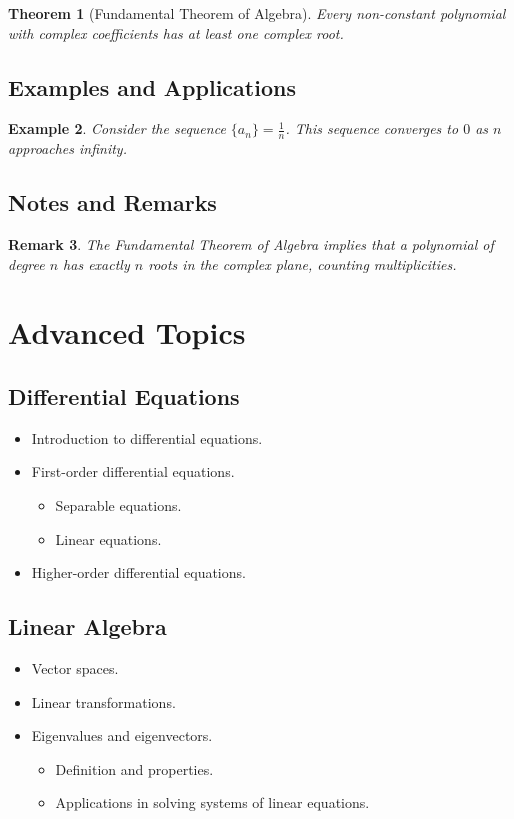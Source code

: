 \documentclass[11pt]{article}
\newtheorem{theorem}{Theorem}[section]
\newtheorem{example}[theorem]{Example}
\newtheorem{remark}[theorem]{Remark}
\begin{document}
\begin{theorem}[Fundamental Theorem of Algebra]
    Every non-constant polynomial with complex coefficients has at least one complex root.
\end{theorem}

\subsection{Examples and Applications}
\begin{example}
    Consider the sequence $\{a_n\} = \frac{1}{n}$. This sequence converges to $0$ as $n$ approaches infinity.
\end{example}

\subsection{Notes and Remarks}
\begin{remark}
    The Fundamental Theorem of Algebra implies that a polynomial of degree $n$ has exactly $n$ roots in the complex plane, counting multiplicities.
\end{remark}

\section{Advanced Topics}

\subsection{Differential Equations}
\begin{itemize}
    \item Introduction to differential equations.
    \item First-order differential equations.
    \begin{itemize}
        \item Separable equations.
        \item Linear equations.
    \end{itemize}
    \item Higher-order differential equations.
\end{itemize}

\subsection{Linear Algebra}
\begin{itemize}
    \item Vector spaces.
    \item Linear transformations.
    \item Eigenvalues and eigenvectors.
    \begin{itemize}
        \item Definition and properties.
        \item Applications in solving systems of linear equations.
    \end{itemize}
\end{itemize}
\end{document}
